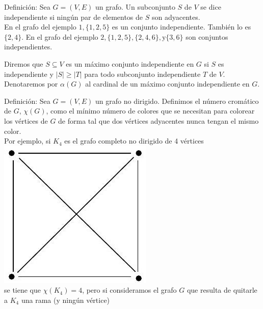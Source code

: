\documentclass[10pt]{article}
\begin{document}
Definición: Sea $G=(V, E)$ un grafo. Un subconjunto $S$ de $V$ se dice independiente si ningún par de elementos de $S$ son adyacentes.\\
En el grafo del ejemplo $1,\{1,2,5\}$ es un conjunto independiente. También lo es $\{2,4\}$. En el grafo del ejemplo $2,\{1,2,5\},\{2,4,6\}, \mathrm{y}\{3,6\}$ son conjuntos independientes.

Diremos que $S \subseteq V$ es un máximo conjunto independiente en $G$ si $S$ es independiente y $|S| \geq|T|$ para todo subconjunto independiente $T$ de $V$. Denotaremos por $\alpha(G)$ al cardinal de un máximo conjunto independiente en $G$.

Definición: Sea $G=(V, E)$ un grafo no dirigido. Definimos el número cromático de $G$, $\chi(G)$, como el mínimo número de colores que se necesitan para colorear los vértices de $G$ de forma tal que dos vértices adyacentes nunca tengan el mismo color.\\
Por ejemplo, si $K_{4}$ es el grafo completo no dirigido de 4 vértices\\
\includegraphics[max width=\textwidth, center]{2025_09_05_b69e29efaf9a6d2aa81ag-06(1)}\\
se tiene que $\chi\left(K_{4}\right)=4$, pero si consideramos el grafo $G$ que resulta de quitarle a $K_{4}$ una rama (y ningún vértice)\\
\end{document}
